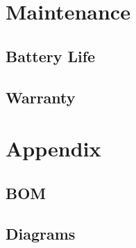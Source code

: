 \documentclass[letterpaper]{report}
\begin{document}
\section{Maintenance}
	\subsection{Battery Life}
	\subsection{Warranty}
\section{Appendix}
	\subsection{BOM}
	\subsection{Diagrams}
\end{document}
